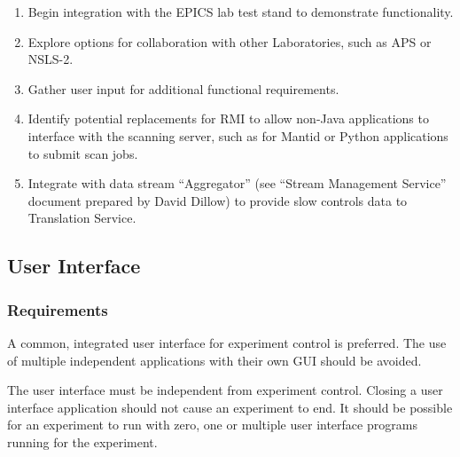 \begin{enumerate}

\item Begin integration with the EPICS lab test stand to demonstrate
functionality.

\item Explore options for collaboration with other Laboratories, such
as APS or NSLS-2.

\item Gather user input for additional functional requirements.

\item Identify potential replacements for RMI to allow non-Java
applications to interface with the scanning server, such as for Mantid
or Python applications to submit scan jobs.

\item Integrate with data stream ``Aggregator'' (see ``Stream Management
Service'' document prepared by David Dillow) to provide slow controls
data to Translation Service. 

\end{enumerate}


\subsection{User Interface}
\subsubsection{Requirements}

A common, integrated user interface for experiment control is preferred.
The use of multiple independent applications with their own GUI should
be avoided.

The user interface must be independent from experiment control. Closing
a user interface application should not cause an experiment to end. It
should be possible for an experiment to run with zero, one or multiple
user interface programs running for the experiment.

